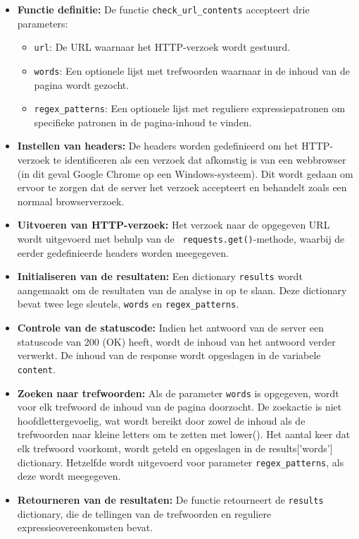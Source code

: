 \begin{itemize}
    \item \textbf{Functie definitie: }De functie \texttt{check\_url\_contents} accepteert drie parameters:
        \begin{itemize}
            \item \texttt{url}: De URL waarnaar het HTTP-verzoek wordt gestuurd.
            \item \texttt{words}: Een optionele lijst met trefwoorden waarnaar in de inhoud van de pagina wordt gezocht.
            \item \texttt{regex\_patterns}: Een optionele lijst met reguliere expressiepatronen om specifieke patronen in de pagina-inhoud te vinden.
        \end{itemize}

    \item \textbf{Instellen van headers: }De headers worden gedefinieerd om het HTTP-verzoek te identificeren als een verzoek dat afkomstig is van een webbrowser (in dit geval Google Chrome op een Windows-systeem). Dit wordt gedaan om ervoor te zorgen dat de server het verzoek accepteert en behandelt zoals een normaal browserverzoek.

    \item \textbf{Uitvoeren van HTTP-verzoek: }Het verzoek naar de opgegeven URL wordt uitgevoerd met behulp van de \texttt{ requests.get()}-methode, waarbij de eerder gedefinieerde headers worden meegegeven.

    \item \textbf{Initialiseren van de resultaten: } Een dictionary \texttt{results} wordt aangemaakt om de resultaten van de analyse in op te slaan. Deze dictionary bevat twee lege sleutels, \texttt{words} en \texttt{regex\_patterns}.

    \item \textbf{Controle van de statuscode:} Indien het antwoord van de server een statuscode van 200 (OK) heeft, wordt de inhoud van het antwoord verder verwerkt. De inhoud van de response wordt opgeslagen in de variabele \texttt{content}.

    \item \textbf{Zoeken naar trefwoorden: }Als de parameter \texttt{words} is opgegeven, wordt voor elk trefwoord de inhoud van de pagina doorzocht. De zoekactie is niet hoofdlettergevoelig, wat wordt bereikt door zowel de inhoud als de trefwoorden naar kleine letters om te zetten met lower(). Het aantal keer dat elk trefwoord voorkomt, wordt geteld en opgeslagen in de results['words'] dictionary. Hetzelfde wordt uitgevoerd voor parameter \texttt{regex\_patterns}, als deze wordt meegegeven.

    \item \textbf{Retourneren van de resultaten: } De functie retourneert de \texttt{results} dictionary, die de tellingen van de trefwoorden en reguliere expressieovereenkomsten bevat.
\end{itemize}

